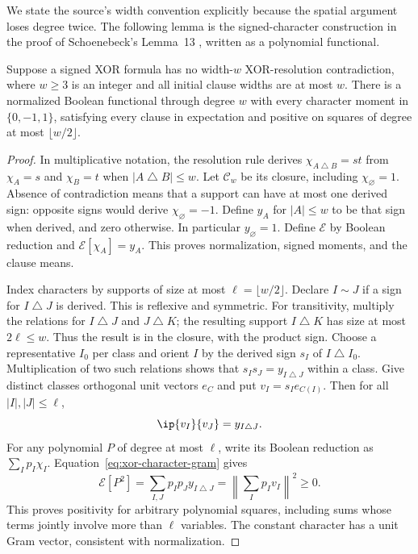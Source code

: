 We state the source's width convention explicitly because the spatial
argument loses degree twice. The following lemma is the signed-character
construction in the proof of Schoenebeck's Lemma~13
\citep[Theorems 11--12 and Lemma 13]{Schoenebeck2008}, written as a
polynomial functional.

\begin{lemma}\label{lem:xor-width-moments}
Suppose a signed XOR formula has no width-$w$ XOR-resolution contradiction,
where $w\ge3$ is an integer and all initial clause widths are at most $w$.
There is a normalized Boolean functional through degree $w$ with every
character moment in $\{0,-1,1\}$, satisfying every clause in expectation
and positive on squares of degree at most $\lfloor w/2\rfloor$.
\end{lemma}
\begin{proof}
In multiplicative notation, the resolution rule derives
$\chi_{A\mathbin\triangle B}=st$ from $\chi_A=s$ and $\chi_B=t$
when $|A\mathbin\triangle B|\le w$. Let $\mathcal C_w$ be its closure,
including $\chi_\varnothing=1$. Absence of contradiction means that a
support can have at most one derived sign: opposite signs would derive
$\chi_\varnothing=-1$. Define $y_A$ for $|A|\le w$ to be that sign
when derived, and zero otherwise. In particular $y_\varnothing=1$.
Define $\mathcal E$ by Boolean reduction and $\mathcal E[\chi_A]=y_A$.
This proves normalization, signed moments, and the clause means.

Index characters by supports of size at most $\ell=\lfloor w/2\rfloor$.
Declare $I\sim J$ if a sign for $I\mathbin\triangle J$ is derived.
This is reflexive and symmetric. For transitivity, multiply the relations
for $I\mathbin\triangle J$ and $J\mathbin\triangle K$; the resulting
support $I\mathbin\triangle K$ has size at most $2\ell\le w$.
Thus the result is in the closure, with the product sign. Choose a
representative $I_0$ per class and orient $I$ by the derived sign
$s_I$ of $I\mathbin\triangle I_0$. Multiplication of two such relations
shows that $s_Is_J=y_{I\mathbin\triangle J}$ within a class. Give
distinct classes orthogonal unit vectors $e_C$ and put $v_I=s_Ie_{C(I)}$.
Then for all $|I|,|J|\le\ell$,
\begin{equation}\label{eq:xor-character-gram}
 \ip{v_I}{v_J}=y_{I\mathbin\triangle J}.
\end{equation}
For any polynomial $P$ of degree at most $\ell$, write its Boolean
reduction as $\sum_I p_I\chi_I$. Equation~\eqref{eq:xor-character-gram}
gives
\[
 \mathcal E[P^2]=\sum_{I,J}p_Ip_Jy_{I\mathbin\triangle J}
              =\left\|\sum_Ip_Iv_I\right\|^2\ge0.
\]
This proves positivity for arbitrary polynomial squares, including sums
whose terms jointly involve more than $\ell$ variables. The constant
character has a unit Gram vector, consistent with normalization.
\end{proof}

